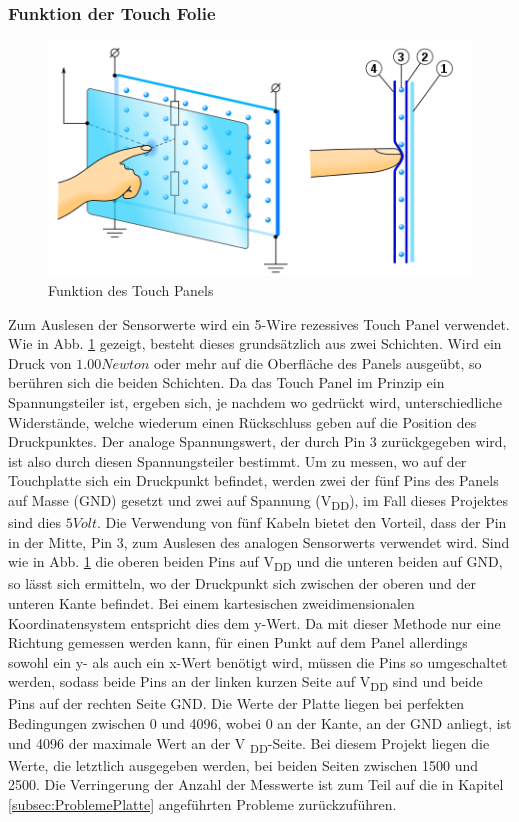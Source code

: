 \documentclass[12pt,a4paper,bibliography=totoc,listof=totoc]{scrartcl}
\begin{document}
\subsubsection{Funktion der Touch Folie}

\begin{figure}[htbp]
	\centering
	\includegraphics[scale = 0.6]{pics/TouchScreen_5wires.png}
	\caption{Funktion des Touch Panels} 
	\label{fig:TouchPanelFunction}
\end{figure}

Zum Auslesen der Sensorwerte wird ein 5-Wire rezessives Touch Panel verwendet.\newline
Wie in Abb. \ref{fig:TouchPanelFunction} \cite {wikipdeia} gezeigt, besteht dieses grundsätzlich aus zwei Schichten. Wird ein Druck von $1.00 Newton$ oder mehr auf die Oberfläche des Panels ausgeübt, so berühren sich die beiden Schichten. Da das Touch Panel im Prinzip ein Spannungsteiler ist, ergeben sich, je nachdem wo gedrückt wird, unterschiedliche Widerstände, welche wiederum einen Rückschluss geben auf die Position des Druckpunktes. Der analoge Spannungswert, der durch Pin 3 zurückgegeben wird, ist also durch diesen Spannungsteiler bestimmt.\newline
Um zu messen, wo auf der Touchplatte sich ein Druckpunkt befindet, werden zwei der fünf Pins des Panels auf Masse (GND) gesetzt und zwei auf Spannung (V\textsubscript{DD}), im Fall dieses Projektes sind dies $5 Volt$. Die Verwendung von fünf Kabeln bietet den Vorteil, dass der Pin in der Mitte, Pin 3, zum Auslesen des analogen Sensorwerts verwendet wird.
Sind wie in Abb. \ref{fig:TouchPanelFunction} die oberen beiden Pins auf V\textsubscript{DD} und die unteren beiden auf GND, so lässt sich ermitteln, wo der Druckpunkt sich zwischen der oberen und der unteren Kante befindet. Bei einem kartesischen zweidimensionalen Koordinatensystem entspricht dies dem y-Wert.
Da mit dieser Methode nur eine Richtung gemessen werden kann, für einen Punkt auf dem Panel allerdings sowohl ein y- als auch ein x-Wert benötigt wird, müssen die Pins so umgeschaltet werden, sodass beide Pins an der linken kurzen Seite auf V\textsubscript{DD} sind und beide Pins auf der rechten Seite GND.\newline
Die Werte der Platte liegen bei perfekten Bedingungen zwischen  0 und 4096, wobei 0 an der Kante, an der GND anliegt, ist und 4096 der maximale Wert an der V \textsubscript{DD}-Seite. Bei diesem Projekt liegen die Werte, die letztlich ausgegeben werden, bei beiden Seiten zwischen 1500 und 2500. Die Verringerung der Anzahl der Messwerte ist zum Teil auf die in Kapitel \ref{subsec:ProblemePlatte} angeführten Probleme zurückzuführen.
\end{document}
